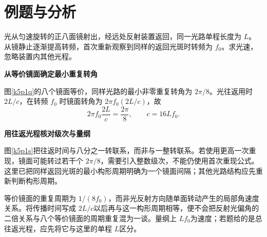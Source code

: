 \section{例题与分析}
\begin{question}\begin{example}[八面转镜测光速]\label{k5p1}
光从匀速旋转的正八面镜射出，经远处反射装置返回，同一光路单程长度为 $L$。从镜静止逐渐提高转频，首次重新观察到同样的返回光斑时转频为 $f_0$。求光速，忽略装置内其他光程。\end{example}
\end{question}
\begin{solution}\textbf{从等价镜面确定最小重复转角}\par\nobreak
图\ref{k5p1q}的八个镜面等价，同样光路的最小非零重复转角为 $2\pi/8$。光往返用时 $2L/c$，在转频 $f_0$ 时镜面转角为 $2\pi f_0(2L/c)$，故
\[2\pi f_0\frac{2L}{c}=\frac{2\pi}{8},\qquad \boxed{c=16Lf_0}.\]



\par\medskip{}\noindent\textbf{用往返光程核对级次与量纲}\par\nobreak
图\ref{k5p1s}把往返时间与八分之一转联系，而非与一整转联系。若使用更高一次重现，镜面可能转过若干个 $2\pi/8$，需要引入整数级次，不能仍使用首次重现公式。这里已把同样返回光斑的最小构形周期明确为一个镜面间隔；其他光路结构应先重新判断构形周期。

等价镜面的重复周期为 $1/(8f_0)$，而非光反射方向随单面转动产生的局部角速度关系。将传播时间写成 $2L/c$以后再与这一构形周期相等，便不会把反射光偏角的二倍关系与八个等价镜面的周期重复混为一谈。量纲上 $Lf_0$为速度；若题给的是总往返光程，应先将它与这里的单程 $L$区分。\end{solution}

